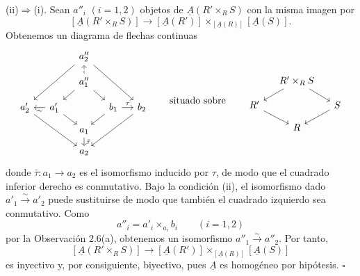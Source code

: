 (ii)$\Rightarrow$(i). Sean $a''_i$ $(i=1,2)$ objetos de
$\underline A(R'\times_RS)$ con la misma imagen por
\[
 [\underline A(R'\times_RS)]\longrightarrow
 [\underline A(R')]
 \times_{[\underline A(R)]}[\underline A(S)].
\]
Obtenemos un diagrama de flechas continuas
\[
\begin{tikzcd}[column sep=small,row sep=small]
 && a''_2 \arrow[ddll] \arrow[ddrr] &&\\
 && a''_1 \arrow[u,dashed] \arrow[dl] \arrow[dr] &&\\
 a'_2 \arrow[ddrr] & a'_1 \arrow[l,"{\sim}"] \arrow[dr]
 && b_1 \arrow[r,"{\tau}"] \arrow[dl] & b_2 \arrow[ddll]\\
 && a_1 \arrow[d,"{\bar\tau}"] &&\\
 && a_2 &&
\end{tikzcd}
\qquad\text{situado sobre}\qquad
\begin{tikzcd}[column sep=small,row sep=small]
 & R'\times_RS \arrow[dl] \arrow[dr] &\\
 R' \arrow[dr] && S \arrow[dl]\\
 & R &
\end{tikzcd}
\]
donde $\bar\tau:a_1\longrightarrow a_2$ es el isomorfismo inducido
por $\tau$, de modo que el cuadrado inferior derecho es conmutativo.
Bajo la condición (ii), el isomorfismo dado
$a'_1\xrightarrow{\sim}a'_2$ puede sustituirse de modo que también el
cuadrado izquierdo sea conmutativo. Como
\[
 a''_i=a'_i\times_{a_i}b_i\qquad(i=1,2)
\]
por la Observación 2.6(a), obtenemos un isomorfismo
$a''_1\xrightarrow{\sim}a''_2$. Por tanto,
\[
 [\underline A(R'\times_RS)]\longrightarrow
 [\underline A(R')]
 \times_{[\underline A(R)]}[\underline A(S)]
\]
es inyectivo y, por consiguiente, biyectivo, pues $\underline A$ es
homogéneo por hipótesis. \hfill$\square$
